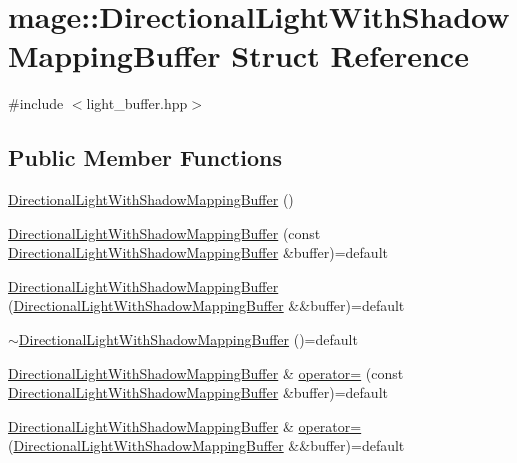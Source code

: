 \hypertarget{structmage_1_1_directional_light_with_shadow_mapping_buffer}{}\section{mage\+:\+:Directional\+Light\+With\+Shadow\+Mapping\+Buffer Struct Reference}
\label{structmage_1_1_directional_light_with_shadow_mapping_buffer}


{\ttfamily \#include $<$light\+\_\+buffer.\+hpp$>$}

\subsection*{Public Member Functions}
\begin{DoxyCompactItemize}
\item 
\hyperlink{structmage_1_1_directional_light_with_shadow_mapping_buffer_a4657f8c201fda21988dea072c70615bb}{Directional\+Light\+With\+Shadow\+Mapping\+Buffer} ()
\item 
\hyperlink{structmage_1_1_directional_light_with_shadow_mapping_buffer_afc29c8403c453f50181ac8675cf89407}{Directional\+Light\+With\+Shadow\+Mapping\+Buffer} (const \hyperlink{structmage_1_1_directional_light_with_shadow_mapping_buffer}{Directional\+Light\+With\+Shadow\+Mapping\+Buffer} \&buffer)=default
\item 
\hyperlink{structmage_1_1_directional_light_with_shadow_mapping_buffer_aacd039c19b590d9d238ed1ec90d25721}{Directional\+Light\+With\+Shadow\+Mapping\+Buffer} (\hyperlink{structmage_1_1_directional_light_with_shadow_mapping_buffer}{Directional\+Light\+With\+Shadow\+Mapping\+Buffer} \&\&buffer)=default
\item 
\hyperlink{structmage_1_1_directional_light_with_shadow_mapping_buffer_aaf69f9a370b547844fe51ccebc791876}{$\sim$\+Directional\+Light\+With\+Shadow\+Mapping\+Buffer} ()=default
\item 
\hyperlink{structmage_1_1_directional_light_with_shadow_mapping_buffer}{Directional\+Light\+With\+Shadow\+Mapping\+Buffer} \& \hyperlink{structmage_1_1_directional_light_with_shadow_mapping_buffer_a9a166d9ce2e74442b98e0d02bcbf18b8}{operator=} (const \hyperlink{structmage_1_1_directional_light_with_shadow_mapping_buffer}{Directional\+Light\+With\+Shadow\+Mapping\+Buffer} \&buffer)=default
\item 
\hyperlink{structmage_1_1_directional_light_with_shadow_mapping_buffer}{Directional\+Light\+With\+Shadow\+Mapping\+Buffer} \& \hyperlink{structmage_1_1_directional_light_with_shadow_mapping_buffer_a19765ecbd12d4f346269a22791d5347c}{operator=} (\hyperlink{structmage_1_1_directional_light_with_shadow_mapping_buffer}{Directional\+Light\+With\+Shadow\+Mapping\+Buffer} \&\&buffer)=default
\end{DoxyCompactItemize}
